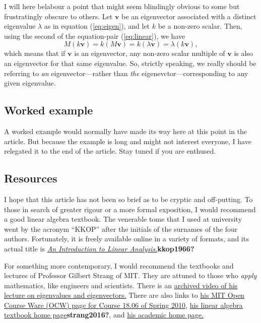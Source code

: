 \documentclass[
  12pt,
  a4paper,
]{article}
\begin{document}
I will here belabour a point that might seem blindingly obvious to some
but frustratingly obscure to others. Let \(\boldsymbol{v}\) be an
eigenvector associated with a distinct eigenvalue \(\lambda\) as in
equation (\ref{eq:eigen}), and let \(k\) be a non-zero scalar. Then,
using the second of the equation-pair (\ref{eq:linear}), we have
\begin{equation}
M(k\boldsymbol{v}) = k(M\boldsymbol{v}) = k(\lambda\boldsymbol{v}) = \lambda(k\boldsymbol{v}),
\label{eq:scaled-eigenvector}\end{equation} which means that if
\(\boldsymbol{v}\) is an eigenvector, any non-zero scalar multiple of
\(\boldsymbol{v}\) is also an eigenvector for that same eigenvalue. So,
strictly speaking, we really should be referring to \emph{an}
eigenvector---rather than \emph{the} eigenevctor---corresponding to any
given eigenvalue.

\hypertarget{worked-example}{%
\subsection{Worked example}\label{worked-example}}

A worked example would normally have made its way here at this point in
the article. But because the example is long and might not interest
everyone, I have relegated it to the end of the article. Stay tuned if
you are enthused.

\hypertarget{resources}{%
\subsection{Resources}\label{resources}}

I hope that this article has not been so brief as to be cryptic and
off-putting. To those in search of greater rigour or a more formal
exposition, I would recommend a good linear algebra textbook. The
venerable tome that I used at university went by the acronym ``KKOP''
after the initials of the surnames of the four authors. Fortunately, it
is freely available online in a variety of formats, and its actual title
is
\href{https://archive.org/details/AnIntroductionToLinearAnalysis}{\emph{An
Introduction to Linear Analysis}.}\textbf{kkop1966?}

For something more contemporary, I would recommend the textbooks and
lectures of Professor Gilbert Strang of MIT. They are attuned to those
who \emph{apply} mathematics, like engineers and scientists. There is an
\href{https://archive.org/details/MIT18.06S05_MP4}{archived video of his
lecture on eigenvalues and eigenvectors.} There are also links to
\href{http://ocw.mit.edu/courses/mathematics/18-06-linear-algebra-spring-2010/}{his
MIT Open Course Ware (OCW) page for Course 18.06 of Spring 2010},
\href{http://math.mit.edu/~gs/linearalgebra/}{his linear algebra
textbook home page}\textbf{strang2016?}, and
\href{http://www-math.mit.edu/~gs/}{his academic home page.}
\end{document}
